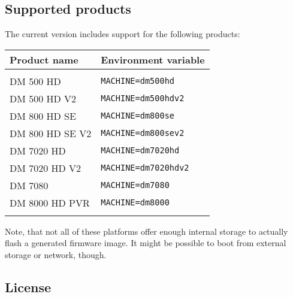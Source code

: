 \documentclass[a4paper]{article}
\newcommand{\shell}[1]{\texttt{\small #1}}
\begin{document}
  \subsection{Supported products}
    \label{products}
    \begin{flushleft}
      The current version includes support for the following products:

        \begin{tabular}{ | l | l | }
          \hline
          \textbf{Product name} & \textbf{Environment variable} \\ \hline
          & \\
          DM 500 HD & \shell{MACHINE=dm500hd} \\
          DM 500 HD V2 & \shell{MACHINE=dm500hdv2} \\
          DM 800 HD SE & \shell{MACHINE=dm800se} \\
          DM 800 HD SE V2 & \shell{MACHINE=dm800sev2} \\
          DM 7020 HD & \shell{MACHINE=dm7020hd} \\
          DM 7020 HD V2 & \shell{MACHINE=dm7020hdv2} \\
          DM 7080 & \shell{MACHINE=dm7080} \\
          DM 8000 HD PVR & \shell{MACHINE=dm8000} \\
          & \\
          \hline
        \end{tabular}

      Note, that not all of these platforms offer enough internal
      storage to actually flash a generated firmware image. It might be possible
      to boot from external storage or network, though.
    \end{flushleft}

  \subsection{License}
\end{document}
